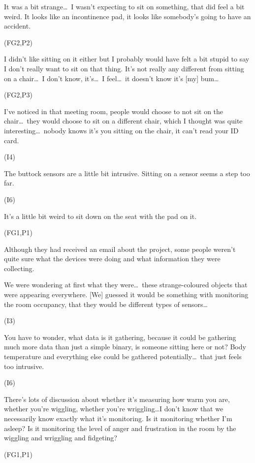 \begin{qt}It was a bit strange\ldots\  I wasn’t
expecting to sit on something, that did feel a bit weird. It looks like an incontinence pad, it looks
like somebody’s going to have an accident.\end{qt} (FG2,P2)

\begin{qt}I didn’t like sitting on it either but I probably would have felt a
bit stupid to say I don’t really want to sit on that thing. It’s not
really any different from sitting on a chair\ldots\  I don’t know,
it’s\ldots\  I feel\ldots\  it doesn’t know it’s [my] bum\ldots\end{qt} (FG2,P3)

\begin{qt}I’ve noticed in that meeting room, people would choose
to not sit on the chair\ldots\  they would choose to sit on a different
chair, which I thought was quite interesting\ldots\  nobody knows it’s you
sitting on the chair, it can’t read your ID card.\end{qt} (I4)

\begin{qt}The buttock sensors are a little bit intrusive. Sitting on a sensor seems a step too far.\end{qt} (I6)

\begin{qt}It’s a little bit weird to sit down on the seat with the pad on it.\end{qt} (FG1,P1)

Although they had received an email about the project, some people weren't quite sure what the devices were doing and what information they were collecting.

\begin{qt}We were wondering at first what they were\ldots\  these strange-coloured
objects that were appearing everywhere. [We] guessed it would be
something with monitoring the room occupancy, that they would be
different types of sensors\ldots \end{qt} (I3)

\begin{qt}You have to wonder, what data is it gathering, because it
  could be gathering much more data than just a simple binary, is
  someone sitting here or not? Body temperature and everything else
  could be gathered potentially\ldots\ that just feels too
  intrusive.\end{qt} (I6)

\begin{qt}There’s lots of discussion about whether it’s measuring how
  warm you are, whether you’re wiggling, whether you’re wriggling…I
  don’t know that we necessarily know exactly what it’s monitoring. Is
  it monitoring whether I’m asleep? Is it monitoring the level of
  anger and frustration in the room by the wiggling and wriggling and
  fidgeting?\end{qt} (FG1,P1)

